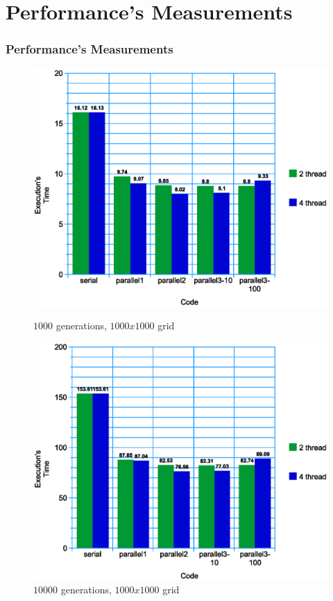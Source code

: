 \documentclass{beamer}
\begin{document}
\section{Performance's Measurements}
\begin{frame}
	\frametitle{Performance's Measurements}

	\begin{figure}
		\centering
		\begin{minipage}{0.5\textwidth}
			\centering
			\includegraphics[width=\linewidth]{../report/graph.eps}
			\caption{$1000$ generations, $1000x1000$ grid}
		\end{minipage}%
		\begin{minipage}{0.5\textwidth}
			\centering
			\includegraphics[width=\linewidth]{../report/1000-10000.eps}
			\caption{$10000$ generations, $1000x1000$ grid}
		\end{minipage}
	\end{figure}
\end{frame}
\end{document}

